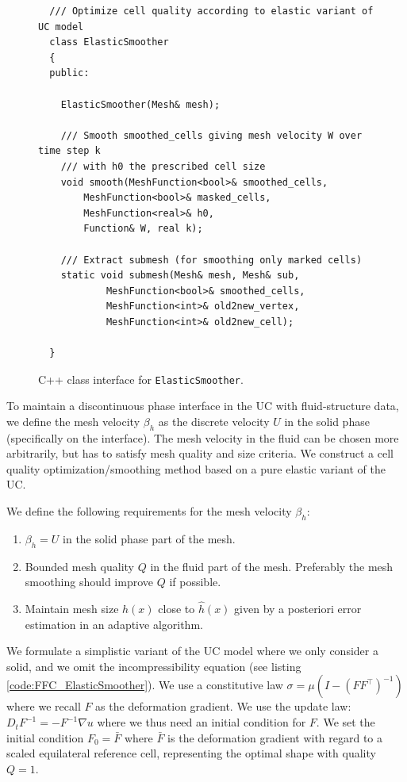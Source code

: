 \begin{figure}[!h]
\begin{lstlisting}
  /// Optimize cell quality according to elastic variant of UC model
  class ElasticSmoother
  {
  public:
    
    ElasticSmoother(Mesh& mesh);

    /// Smooth smoothed_cells giving mesh velocity W over time step k
    /// with h0 the prescribed cell size
    void smooth(MeshFunction<bool>& smoothed_cells,
		MeshFunction<bool>& masked_cells,
		MeshFunction<real>& h0,
		Function& W, real k);

    /// Extract submesh (for smoothing only marked cells)
    static void submesh(Mesh& mesh, Mesh& sub,
			MeshFunction<bool>& smoothed_cells,
			MeshFunction<int>& old2new_vertex,
			MeshFunction<int>& old2new_cell);
    
  }
\end{lstlisting}
\caption{
C++ class interface for {\tt ElasticSmoother}.
}
\label{code:ElasticSmoother}
\end{figure}

To maintain a discontinuous phase interface in the UC with
fluid-structure data, we define the mesh velocity $\beta_h$ as the
discrete velocity $U$ in the solid phase (specifically on the
interface). The mesh velocity in the fluid can be chosen more
arbitrarily, but has to satisfy mesh quality and size criteria. We
construct a cell quality optimization/smoothing method based on a pure
elastic variant of the UC.

We define the following requirements for the mesh velocity $\beta_h$:

\begin{enumerate}
\item
$\beta_h = U$ in the solid phase part of the mesh.
\item
Bounded mesh quality $Q$ in the fluid part of the mesh. Preferably the
mesh smoothing should improve $Q$ if possible.
\item
Maintain mesh size $h(x)$ close to $\hat{h}(x)$ given by a posteriori
error estimation in an adaptive algorithm.
\end{enumerate}

We formulate a simplistic variant of the UC model where we only
consider a solid, and we omit the incompressibility equation (see
listing \ref{code:FFC_ElasticSmoother}). We use a constitutive law
$\sigma = \mu(I - (FF^\top)^{-1})$ where we recall $F$ as the
deformation gradient. We use the update law: $D_t F^{-1} =
-F^{-1} \nabla u$ where we thus need an initial condition for $F$. We
set the initial condition $F_0 = \bar{F}$ where $\bar{F}$ is the
deformation gradient with regard to a scaled equilateral reference
cell, representing the optimal shape with quality $Q = 1$.

